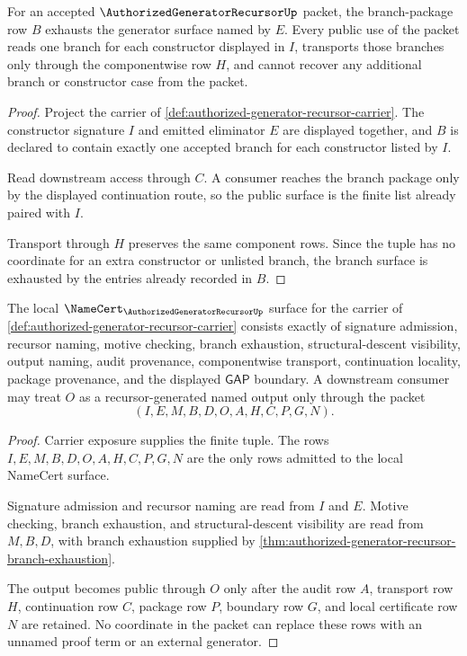 \begin{theorem}
\label{thm:authorized-generator-recursor-branch-exhaustion}
For an accepted $\AuthorizedGeneratorRecursorUp$ packet, the branch-package row $B$ exhausts the generator surface named by $E$. Every public use of the packet reads one branch for each constructor displayed in $I$, transports those branches only through the componentwise row $H$, and cannot recover any additional branch or constructor case from the packet.
\end{theorem}
\begin{proof}
Project the carrier of \autoref{def:authorized-generator-recursor-carrier}. The constructor signature $I$ and emitted eliminator $E$ are displayed together, and $B$ is declared to contain exactly one accepted branch for each constructor listed by $I$.

Read downstream access through $C$. A consumer reaches the branch package only by the displayed continuation route, so the public surface is the finite list already paired with $I$.

Transport through $H$ preserves the same component rows. Since the tuple has no coordinate for an extra constructor or unlisted branch, the branch surface is exhausted by the entries already recorded in $B$.
\end{proof}

\begin{theorem}
\label{thm:authorized-generator-recursor-namecert-surface}
The local $\NameCert_{\AuthorizedGeneratorRecursorUp}$ surface for the carrier of \autoref{def:authorized-generator-recursor-carrier} consists exactly of signature admission, recursor naming, motive checking, branch exhaustion, structural-descent visibility, output naming, audit provenance, componentwise transport, continuation locality, package provenance, and the displayed $\mathsf{GAP}$ boundary. A downstream consumer may treat $O$ as a recursor-generated named output only through the packet
$$
(I,E,M,B,D,O,A,H,C,P,G,N).
$$
\end{theorem}
\begin{proof}
Carrier exposure supplies the finite tuple. The rows $I,E,M,B,D,O,A,H,C,P,G,N$ are the only rows admitted to the local NameCert surface.

Signature admission and recursor naming are read from $I$ and $E$. Motive checking, branch exhaustion, and structural-descent visibility are read from $M,B,D$, with branch exhaustion supplied by \autoref{thm:authorized-generator-recursor-branch-exhaustion}.

The output becomes public through $O$ only after the audit row $A$, transport row $H$, continuation row $C$, package row $P$, boundary row $G$, and local certificate row $N$ are retained. No coordinate in the packet can replace these rows with an unnamed proof term or an external generator.
\end{proof}

